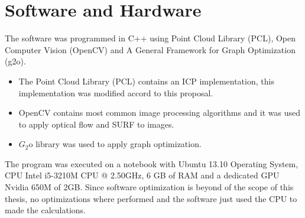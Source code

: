 \section{Software and Hardware}

The software was programmed in C++ using Point Cloud Library (PCL), Open Computer Vision (OpenCV) and 
A General Framework for Graph Optimization (g2o).

\begin{itemize}

\item The Point Cloud Library (PCL) \cite{pcl} contains an ICP implementation, this implementation 
was modified accord to this proposal.

\item OpenCV \cite{opencv} contains most common image processing algorithms and it was used to apply 
optical flow and SURF to images. 

\item $G_2$o library \cite{g2o}  was used to apply graph optimization.

\end{itemize}

The program was executed on a notebook with Ubuntu 13.10 Operating System, 
CPU Intel i5-3210M CPU @ 2.50GHz, 6 GB of RAM 
and a dedicated GPU Nvidia 650M of 2GB. Since software optimization is beyond of the scope 
of this thesis, no optimizations where performed and the software just used the CPU to 
made the calculations.
